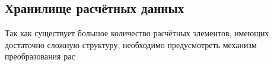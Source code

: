 \subsection{\large{Хранилище расчётных данных}}

Так как существует большое количество расчётных элементов, имеющих достаточно сложную структуру,
необходимо предусмотреть механизм преобразования рас
